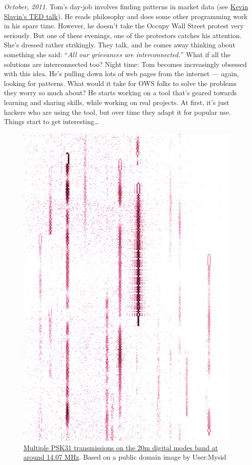\emph{October, 2011}. Tom's day-job involves finding patterns in market
data (see
\href{http://www.ted.com/talks/kevin_slavin_how_algorithms_shape_our_world.html}{Kevin
Slavin's TED talk}). He reads philosophy and does some other programming
work in his spare time. However, he doesn't take the Occupy Wall Street
protest very seriously. But one of these evenings, one of the protestors
catches his attention. She's dressed rather strikingly. They talk, and
he comes away thinking about something she said: ``\emph{All our
grievances are interconnected.}'' What if all the solutions are
interconnected too? Night time: Tom becomes increasingly obsessed with
this idea. He's pulling down lots of web pages from the internet ---
again, looking for patterns. What would it take for OWS folks to solve
the problems they worry so much about? He starts working on a tool
that's geared towards learning and sharing skills, while working on real
projects. At first, it's just hackers who are using the tool, but over
time they adapt it for popular use. Things start to get
interesting\ldots{} 

\begin{figure}[htbp]
\centering
\includegraphics[width=.8\textwidth]{../pictures/matrix-inverted.jpg}
\caption*{\href{https://commons.wikimedia.org/wiki/File:PSK\_matrix.jpg}{Multiple PSK31 transmissions on the 20m digital modes band at around 14.07 MHz}.  Based on a public domain image by User:Mysid}
\end{figure}
